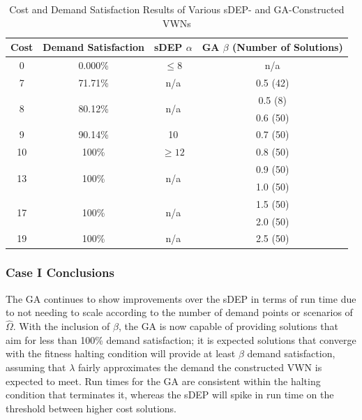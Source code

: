 \documentclass[12pt,dvipsnames]{report}
\begin{document}
\begin{table}[htp]
	\centering
	\caption[Case I Cost and Demand Satisfaction Results]{Cost and Demand Satisfaction Results of Various sDEP- and GA-Constructed VWNs}
	\begin{tabular}{|c|c|c|c|} 
		\hline
		\textbf{Cost} & \textbf{Demand Satisfaction} & \textbf{sDEP $\alpha$} & \textbf{GA $\beta$ (Number of Solutions)} \\
		\hline
		0 & 0.000\% & $\leq 8$ & n/a \\
		\hline
		7 & 71.71\% & n/a & 0.5 (42) \\
		\hline
		\multirow{2}{*}{8} & \multirow{2}{*}{80.12\%} & \multirow{2}{*}{n/a} & 0.5 (8)\\
		& & & 0.6 (50) \\
		\hline
		9 & 90.14\% & 10 & 0.7 (50) \\
		\hline
		10 & 100\% & $\geq 12$ & 0.8 (50) \\
		\hline
		\multirow{2}{*}{13} & \multirow{2}{*}{100\%} & \multirow{2}{*}{n/a} & 0.9 (50) \\
		& & & 1.0 (50) \\
		\hline
		\multirow{2}{*}{17} & \multirow{2}{*}{100\%} & \multirow{2}{*}{n/a} & 1.5 (50) \\
		& & & 2.0 (50) \\
		\hline
		19 & 100\% & n/a & 2.5 (50) \\
		\hline
	\end{tabular}
	\label{tab:CaseI_ComparisonCostSat}
\end{table}

\subsubsection{Case I Conclusions}

The GA continues to show improvements over the sDEP in terms of run time due to not needing to scale according to the number of demand points or scenarios of $\hat{\Omega}$.  With the inclusion of $\beta$, the GA is now capable of providing solutions that aim for less than 100\% demand satisfaction; it is expected solutions that converge with the fitness halting condition will provide at least $\beta$ demand satisfaction, assuming that $\lambda$ fairly approximates the demand the constructed VWN is expected to meet.  Run times for the GA are consistent within the halting condition that terminates it, whereas the sDEP will spike in run time on the threshold between higher cost solutions.
\end{document}
